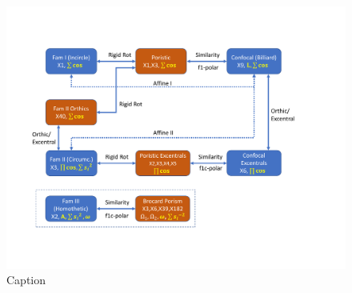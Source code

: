 \begin{figure}
    \centering
    \includegraphics[width=\textwidth]{chap_03/pics/pics_03_250_poncelet_transformations.pdf}
    \caption{Caption}
    \label{fig:my_label}
\end{figure}